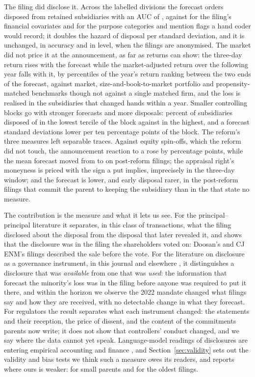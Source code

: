 The filing did disclose it. Across the \NGateOne{} labelled divisions the forecast orders disposed from retained subsidiaries with an AUC of \AUCPooledLLM{}, against \AUCPooledFin{} for the filing's financial covariates and \NestedMTwo{} for the purpose categories and mention flags a hand coder would record; it doubles the hazard of disposal per standard deviation, and it is unchanged, in accuracy and in level, when the filings are anonymised. The market did not price it at the announcement, as far as returns can show: the three-day return rises with the forecast while the market-adjusted return over the following year falls with it, by \RankSpecThreePctl{} percentiles of the year's return ranking between the two ends of the forecast, against market, size-and-book-to-market portfolio and propensity-matched benchmarks though not against a single matched firm, and the loss is realised in the subsidiaries that changed hands within a year. Smaller controlling blocks go with stronger forecasts and more disposals: \LowBlockDisp{} percent of subsidiaries disposed of in the lowest tercile of the block against \HighBlockDisp{} in the highest, and a forecast \ScoreOnBlockTenPPSDAbs{} standard deviations lower per ten percentage points of the block. The reform's three measures left separable traces. Against equity spin-offs, which the reform did not touch, the announcement reaction to a \captive{} rose by \DiDCxP{} percentage points, while the mean forecast moved from \ScorePre{} to \ScorePost{} on \ProtPostN{} post-reform filings; the appraisal right's moneyness is priced with the sign a put implies, imprecisely in the three-day window; and the forecast is lower, and early disposal rarer, in the post-reform filings that commit the parent to keeping the subsidiary than in the \ProtNone{} that state no measure.

The contribution is the measure and what it lets us see. For the principal--principal literature \cite{young2008, claessens2002, masulis2011} it separates, in this class of transactions, what the filing disclosed about the disposal from the disposal that later revealed it, and shows that the disclosure was in the filing the shareholders voted on: Doosan's and CJ ENM's filings described the sale before the vote. For the literature on disclosure as a governance instrument, in this journal and elsewhere \cite{huang2024, liu2026, shim2024}, it distinguishes a disclosure that was \emph{available} from one that was \emph{used}: the information that forecast the minority's loss was in the filing before anyone was required to put it there, and within the horizon we observe the 2022 mandate changed what filings say and how they are received, with no detectable change in what they forecast. For regulators the result separates what each instrument changed: the statements and their reception, the price of dissent, and the content of the commitments parents now write; it does not show that controllers' conduct changed, and we say where the data cannot yet speak. Language-model readings of disclosures are entering empirical accounting and finance \cite{frankel2022, siano2025}, and Section~\ref{sec:validity} sets out the validity and bias tests we think such a measure owes its readers, and reports where ours is weaker: for small parents and for the oldest filings.
